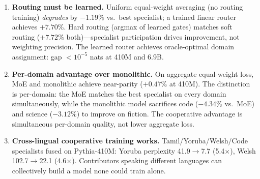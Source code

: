 \documentclass{article}
\begin{document}
\begin{enumerate}[leftmargin=*, itemsep=2pt]
  \item \textbf{Routing must be learned.} Uniform equal-weight averaging (no routing training) \emph{degrades} by $-1.19\%$ vs.\ best specialist; a trained linear router achieves $+7.70\%$. Hard routing (argmax of learned gates) matches soft routing ($+7.72\%$ both)---specialist participation drives improvement, not weighting precision. The learned router achieves oracle-optimal domain assignment: gap ${<}10^{-5}$ nats at 410M and 6.9B.
  \item \textbf{Per-domain advantage over monolithic.} On aggregate equal-weight loss, MoE and monolithic achieve near-parity ($+0.47\%$ at 410M). The distinction is per-domain: the MoE matches the best specialist on every domain simultaneously, while the monolithic model sacrifices code ($-4.34\%$ vs.\ MoE) and science ($-3.12\%$) to improve on fiction. The cooperative advantage is simultaneous per-domain quality, not lower aggregate loss.
  \item \textbf{Cross-lingual cooperative training works.} Tamil/Yoruba/Welsh/Code specialists fused on Pythia-410M: Yoruba perplexity 41.9$\to$7.7 (5.4$\times$), Welsh 102.7$\to$22.1 (4.6$\times$). Contributors speaking different languages can collectively build a model none could train alone.
\end{enumerate}
\end{document}
